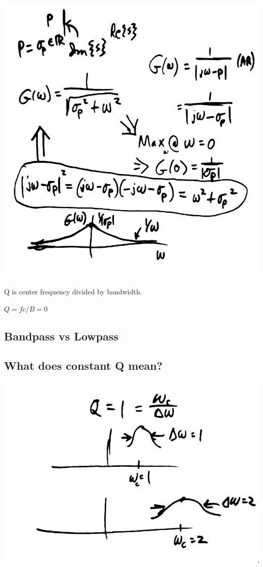 \includegraphics[scale=0.3]{photos/jan26/11b}

Q is center frequency divided by bandwidth. 

$Q = fc/B = 0$


\subsection*{Bandpass vs Lowpass}

\subsection*{What does constant Q mean?}

\includegraphics[scale=0.3]{photos/jan26/11c}

